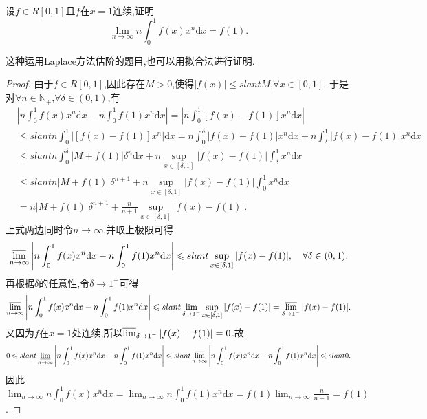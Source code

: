 \documentclass[../../main.tex]{subfiles}
\begin{document}
\begin{example}\label{example4544166848}
设\(f\in R[0,1]\)且\(f\)在\(x = 1\)连续,证明
\[
\lim_{n \to \infty} n\int_{0}^{1} f(x)x^n \mathrm{d}x = f(1).
\]
\end{example}
\begin{note}
这种运用Laplace方法估阶的题目,也可以用拟合法进行证明.
\end{note}
\begin{proof}
由于\(f\in R[0,1]\),因此存在\(M > 0\),使得\(\vert f(x)\vert\leqslant slant M\),\(\forall x\in [0,1]\).
于是对\(\forall n\in\mathbb{N}_+\),\(\forall\delta\in(0,1)\),有
\begin{align*}
&\left\vert n\int_0^1 f(x)x^n \mathrm{d}x - n\int_0^1 f(1)x^n \mathrm{d}x\right\vert=\left\vert n\int_0^1 [f(x) - f(1)]x^n \mathrm{d}x\right\vert\\
&\leqslant slant n\int_0^1 \vert [f(x) - f(1)]x^n\vert \mathrm{d}x
=n\int_0^{\delta} \vert f(x) - f(1)\vert x^n \mathrm{d}x + n\int_{\delta}^1 \vert f(x) - f(1)\vert x^n \mathrm{d}x\\
&\leqslant slant n\int_0^{\delta} \vert M + f(1)\vert\delta^n \mathrm{d}x + n\sup_{x\in[\delta,1]}\vert f(x) - f(1)\vert\int_{\delta}^1 x^n \mathrm{d}x\\
&\leqslant slant n\vert M + f(1)\vert\delta^{n + 1} + n\sup_{x\in[\delta,1]}\vert f(x) - f(1)\vert\int_0^1 x^n \mathrm{d}x\\
&=n\vert M + f(1)\vert\delta^{n + 1} + \frac{n}{n + 1}\sup_{x\in[\delta,1]}\vert f(x) - f(1)\vert.
\end{align*}
上式两边同时令\(n\rightarrow\infty\),并取上极限可得
\[
\varlimsup_{n\rightarrow\infty}\left\vert n\int_0^1 f(x)x^n \mathrm{d}x - n\int_0^1 f(1)x^n \mathrm{d}x\right\vert\leqslant slant\sup_{x\in[\delta,1]}\vert f(x) - f(1)\vert, \quad\forall\delta\in(0,1).
\]
再根据\(\delta\)的任意性,令\(\delta\rightarrow 1^-\)可得
\[
\varlimsup_{n\rightarrow\infty}\left\vert n\int_0^1 f(x)x^n \mathrm{d}x - n\int_0^1 f(1)x^n \mathrm{d}x\right\vert\leqslant slant\lim_{\delta\rightarrow 1^-}\sup_{x\in[\delta,1]}\vert f(x) - f(1)\vert=\varlimsup_{\delta\rightarrow 1^-}\vert f(x) - f(1)\vert.
\]
又因为\(f\)在\(x = 1\)处连续,所以\(\varlimsup_{\delta\rightarrow 1^-}\vert f(x) - f(1)\vert = 0\).故
\[
0\leqslant slant\varliminf_{n\rightarrow\infty}\left\vert n\int_0^1 f(x)x^n \mathrm{d}x - n\int_0^1 f(1)x^n \mathrm{d}x\right\vert\leqslant slant\varlimsup_{n\rightarrow\infty}\left\vert n\int_0^1 f(x)x^n \mathrm{d}x - n\int_0^1 f(1)x^n \mathrm{d}x\right\vert\leqslant slant 0.
\]
因此$\lim_{n\rightarrow\infty}n\int_0^1 f(x)x^n \mathrm{d}x=\lim_{n\rightarrow\infty}n\int_0^1 f(1)x^n \mathrm{d}x = f(1)\lim_{n\rightarrow\infty}\frac{n}{n + 1}=f(1)$.
\end{proof}
\end{document}
